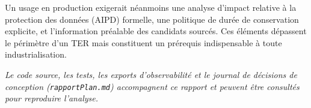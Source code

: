 \medskip

Un usage en production exigerait néanmoins une analyse d'impact relative à la protection des données (AIPD) formelle, une politique de durée de conservation explicite, et l'information préalable des candidats sourcés. Ces éléments dépassent le périmètre d'un TER mais constituent un prérequis indispensable à toute industrialisation.

\medskip
\textit{Le code source, les tests, les exports d'observabilité et le journal de décisions de conception (\texttt{rapportPlan.md}) accompagnent ce rapport et peuvent être consultés pour reproduire l'analyse.}
